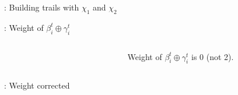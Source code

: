 \documentclass[aspectratio=169,10pt,webfont]{beamer}
\begin{document}

\begin{frame}{\MiniMORUS[640]: Building trails with $\chi_1$ and $\chi_2$}

  \begin{figure}
    \resizebox{!}{0.90\textheight}{%
      
    }
  \end{figure}

\end{frame}



\begin{frame}{\MiniMORUS: Weight of $\beta^t_i \oplus \gamma^t_i$}

\begin{columns}
\begin{column}{0.6\textwidth}
  \begin{figure}
    \resizebox{!}{0.90\textheight}{%
      
    }
  \end{figure}
\end{column}
\begin{column}{0.3\textwidth}  %
        Weight of $\beta^t_i \oplus \gamma^t_i$ is 0 (not 2).
  \end{column}
\end{columns}
\end{frame}


\begin{frame}{\MiniMORUS[640]: Weight corrected}

  \begin{figure}
    \resizebox{!}{0.90\textheight}{%
      
    }
  \end{figure}

\end{frame}


\end{document}

